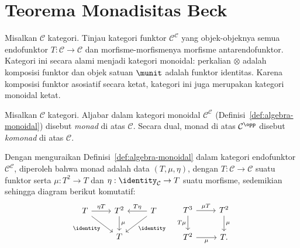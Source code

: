 
\section{Teorema Monadisitas Beck}\label{sec:Beck}
\hypertarget{o014.aljabr2.chapter7.beck-monadicity-a}{ }
Misalkan $\mathcal{C}$ kategori. Tinjau kategori funktor
$\mathcal{C}^{\mathcal{C}}$ yang objek-objeknya semua endofunktor
$T:\mathcal{C}\to\mathcal{C}$ dan morfisme-morfismenya morfisme
antarendofunktor. Kategori ini secara alami menjadi kategori monoidal: perkalian
$\otimes$ adalah komposisi funktor dan objek satuan $\munit$ adalah funktor
identitas. Karena komposisi funktor asosiatif secara ketat, kategori ini juga
merupakan kategori monoidal ketat.

\begin{definition}\label{def:monad}
	Misalkan $\mathcal{C}$ kategori. Aljabar dalam kategori monoidal
	$\mathcal{C}^{\mathcal{C}}$ (Definisi~\ref{def:algebra-monoidal}) disebut
	\emph{monad} di atas $\mathcal{C}$. Secara dual, monad di atas
	$\mathcal{C}^{\opp}$ disebut \emph{komonad} di atas $\mathcal{C}$.
\end{definition}

Dengan menguraikan Definisi~\ref{def:algebra-monoidal} dalam kategori
endofunktor $\mathcal{C}^{\mathcal{C}}$, diperoleh bahwa monad adalah data
$(T,\mu,\eta)$, dengan $T:\mathcal{C}\to\mathcal{C}$ suatu funktor serta
$\mu:T^2\to T$ dan $\eta:\identity_{\mathcal{C}}\to T$ suatu morfisme,
sedemikian sehingga diagram berikut komutatif:
\begin{equation*}\begin{gathered}
	\begin{tikzcd}
		T \arrow[r, "{\eta T}"] \arrow[rd, "\identity"'] & T^2 \arrow[d, "\mu"] & T \arrow[l, "{T\eta}"'] \arrow[ld, "\identity"] \\
		& T &
	\end{tikzcd} \quad
	\begin{tikzcd}
		T^3 \arrow[r, "\mu T"] \arrow[d, "T\mu"'] & T^2 \arrow[d, "\mu"] \\
		T^2 \arrow[r, "\mu"'] & T.
	\end{tikzcd}
\end{gathered}\end{equation*}

